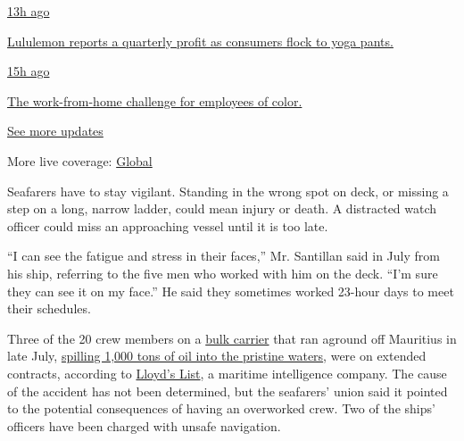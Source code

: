 \href{https://www.nytimes3xbfgragh.onion/live/2020/09/08/business/stock-market-today-coronavirus?action=click\&pgtype=Article\&state=default\&region=MAIN_CONTENT_1\&context=storylines_live_updates\#lululemon-reports-a-quarterly-profit-as-consumers-flock-to-yoga-pants}{13h
ago}

\href{https://www.nytimes3xbfgragh.onion/live/2020/09/08/business/stock-market-today-coronavirus?action=click\&pgtype=Article\&state=default\&region=MAIN_CONTENT_1\&context=storylines_live_updates\#lululemon-reports-a-quarterly-profit-as-consumers-flock-to-yoga-pants}{Lululemon
reports a quarterly profit as consumers flock to yoga pants.}

\href{https://www.nytimes3xbfgragh.onion/live/2020/09/08/business/stock-market-today-coronavirus?action=click\&pgtype=Article\&state=default\&region=MAIN_CONTENT_1\&context=storylines_live_updates\#the-work-from-home-challenge-for-employees-of-color}{15h
ago}

\href{https://www.nytimes3xbfgragh.onion/live/2020/09/08/business/stock-market-today-coronavirus?action=click\&pgtype=Article\&state=default\&region=MAIN_CONTENT_1\&context=storylines_live_updates\#the-work-from-home-challenge-for-employees-of-color}{The
work-from-home challenge for employees of color.}

\href{https://www.nytimes3xbfgragh.onion/live/2020/09/08/business/stock-market-today-coronavirus?action=click\&pgtype=Article\&state=default\&region=MAIN_CONTENT_1\&context=storylines_live_updates}{See
more updates}

More live coverage:
\href{https://www.nytimes3xbfgragh.onion/2020/09/09/world/covid-19-coronavirus.html?action=click\&pgtype=Article\&state=default\&region=MAIN_CONTENT_1\&context=storylines_live_updates}{Global}

Seafarers have to stay vigilant. Standing in the wrong spot on deck, or
missing a step on a long, narrow ladder, could mean injury or death. A
distracted watch officer could miss an approaching vessel until it is
too late.

``I can see the fatigue and stress in their faces,'' Mr. Santillan said
in July from his ship, referring to the five men who worked with him on
the deck. ``I'm sure they can see it on my face.'' He said they
sometimes worked 23-hour days to meet their schedules.

Three of the 20 crew members on a
\href{https://www.nytimes3xbfgragh.onion/2020/08/18/world/africa/captain-mauritius-oil-spill-arrested.html}{bulk
carrier} that ran aground off Mauritius in late July,
\href{https://www.nytimes3xbfgragh.onion/2020/08/28/us/mauritius-dolphin-deaths.html?searchResultPosition=1}{spilling
1,000 tons of oil into the pristine waters}, were on extended contracts,
according to
\href{https://lloydslist.maritimeintelligence.informa.com/daily-briefing/2020/08-august/daily-briefing-august-18-2020}{Lloyd's
List}, a maritime intelligence company. The cause of the accident has
not been determined, but the seafarers' union said it pointed to the
potential consequences of having an overworked crew. Two of the ships'
officers have been charged with unsafe navigation.

